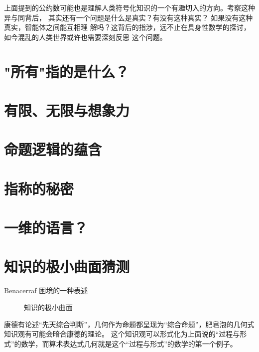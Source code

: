 \documentclass[a4paper,12pt]{article}
\numberwithin{problem}{section}
\numberwithin{definition}{section}
\numberwithin{lemma}{section}
\numberwithin{proposition}{section}
\numberwithin{theorem}{section}
\numberwithin{grammar}{section}
\numberwithin{program}{section}
\numberwithin{convention}{section}
\numberwithin{corollary}{section}
\begin{document}
上面提到的公约数可能也是理解人类符号化知识的一个有趣切入的方向。考察这种异与同背后，
其实还有一个问题是什么是真实？有没有这种真实？ 如果没有这种真实，智能体之间能互相理
解吗？这背后的指涉，远不止在具身性数学的探讨，如今混乱的人类世界或许也需要深刻反思
这个问题。

\section{"所有"指的是什么？}

\section{有限、无限与想象力}

\section{命题逻辑的蕴含}

\section{指称的秘密}

\section{一维的语言？}

\section{知识的极小曲面猜测}

Benacerraf 困境的一种表述

\begin{figure}[ht]
\centering
{}
\caption{知识的极小曲面}
\end{figure}

康德有论述“先天综合判断”，几何作为命题都呈现为“综合命题”，肥皂泡的几何式知识观有可能会暗合康德的理论。
这个知识观可以形式化为上面说的“过程与形式”的数学，而算术表达式几何就是这个“过程与形式”的数学的第一个例子。
\end{document}
